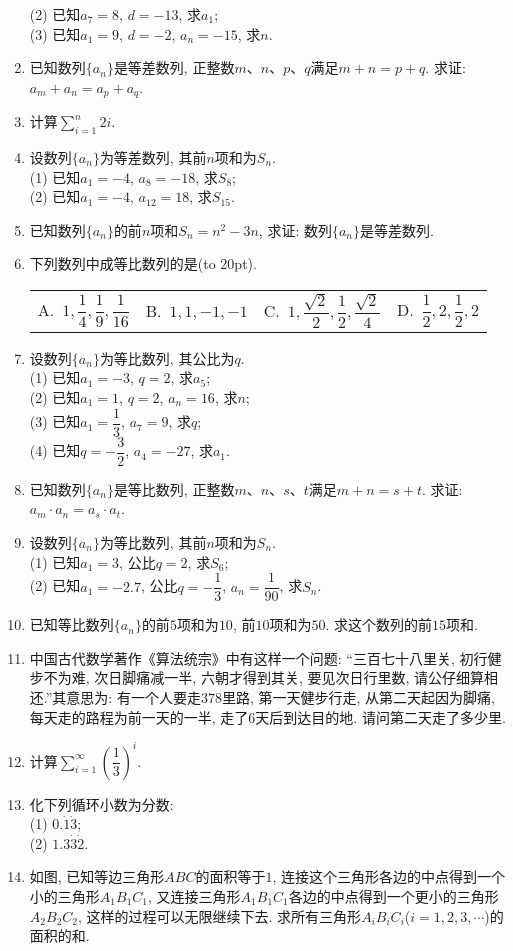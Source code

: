 \documentclass[10pt,a4paper]{article}
\newcommand{\bracket}[1]{(\hbox to #1pt{})}
\newcommand{\fourch}[4]{\par\begin{tabular}{p{.23\textwidth}p{.23\textwidth}p{.23\textwidth}p{.23\textwidth}}
A.~#1 &B.~#2& C.~#3& D.~#4
\end{tabular}}
\begin{document}
\begin{enumerate}[1.]
(2) 已知$a_7=8$, $d=-13$, 求$a_1$;\\
(3) 已知$a_1=9$, $d=-2$, $a_n=-15$, 求$n$.
\item 已知数列$\{a_n\}$是等差数列, 正整数$m$、$n$、$p$、$q$满足$m+n=p+q$. 求证: $a_m+a_n=a_p+a_q$.
\item 计算$\displaystyle\sum_{i=1}^n 2i$.
\item 设数列$\{a_n\}$为等差数列, 其前$n$项和为$S_n$.\\
(1) 已知$a_1=-4$, $a_8=-18$, 求$S_8$;\\
(2) 已知$a_1=-4$, $a_{12}=18$, 求$S_{15}$.
\item 已知数列$\{a_n\}$的前$n$项和$S_n=n^2-3n$, 求证: 数列$\{a_n\}$是等差数列. 
\item 下列数列中成等比数列的是\bracket{20}.
\fourch{$1,\dfrac 14,\dfrac 19,\dfrac1{16}$}{$1,1,-1,-1$}{$1,\dfrac{\sqrt 2}2,\dfrac 12,\dfrac{\sqrt 2}4$}{$\dfrac 12,2,\dfrac 12,2$}
\item 设数列$\{a_n\}$为等比数列, 其公比为$q$.\\
(1) 已知$a_1=-3$, $q=2$, 求$a_5$;\\
(2) 已知$a_1=1$, $q=2$, $a_n=16$, 求$n$;\\
(3) 已知$a_1=\dfrac 13$, $a_7=9$, 求$q$;\\
(4) 已知$q=-\dfrac 32$, $a_4=-27$, 求$a_1$.
\item 已知数列$\{a_n\}$是等比数列, 正整数$m$、$n$、$s$、$t$满足$m+n=s+t$. 求证: $a_m\cdot a_n=a_s\cdot a_t$. 
\item 设数列$\{a_n\}$为等比数列, 其前$n$项和为$S_n$.\\
(1) 已知$a_1=3$, 公比$q=2$, 求$S_6$;\\
(2) 已知$a_1=-2.7$, 公比$q=-\dfrac 13$, $a_n=\dfrac1{90}$, 求$S_n$.
\item 已知等比数列$\{a_n\}$的前$5$项和为$10$, 前$10$项和为$50$. 求这个数列的前$15$项和.
\item 中国古代数学著作《算法统宗》中有这样一个问题: ``三百七十八里关, 初行健步不为难, 次日脚痛减一半, 六朝才得到其关, 要见次日行里数, 请公仔细算相还.''其意思为: 有一个人要走$378$里路, 第一天健步行走, 从第二天起因为脚痛, 每天走的路程为前一天的一半, 走了$6$天后到达目的地. 请问第二天走了多少里. 
\item 计算$\displaystyle\sum_{i=1}^{\infty}(\dfrac 13)^i$.
\item 化下列循环小数为分数:\\
(1) $0.\dot1 \dot 3$;\\
(2) $1.3\dot 3\dot 2$.
\item 如图, 已知等边三角形$ABC$的面积等于$1$, 连接这个三角形各边的中点得到一个小的三角形$A_1B_1C_1$, 又连接三角形$A_1B_1C_1$各边的中点得到一个更小的三角形$A_2B_2C_2$, 这样的过程可以无限继续下去. 求所有三角形$A_iB_iC_i$($i=1,2,3,\cdots$)的面积的和. 

\end{enumerate}
\end{document}
